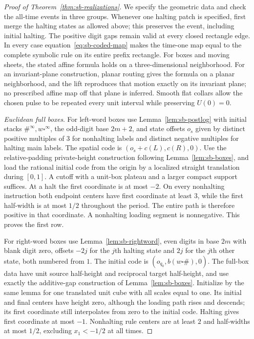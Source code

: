 \begin{proof}[Proof of Theorem~\ref{thm:sb-realizations}]
We specify the geometric data and check the all-time events in three groups.  Whenever one halting patch is specified, first merge the halting states as allowed above; this preserves the event, including initial halting.  The positive digit gaps remain valid at every closed rectangle edge.
In every case equation~\eqref{eq:sb-coded-map} makes the time-one map equal to the complete symbolic rule on its entire prefix rectangle.  For boxes and moving sheets, the stated affine formula holds on a three-dimensional neighborhood. For an invariant-plane construction, planar routing gives the formula on a planar neighborhood, and the lift reproduces that motion exactly on its invariant plane; no prescribed affine map off that plane is inferred.  Smooth flat collars allow the chosen pulse to be repeated every unit interval while preserving $U(0)=0$.

\emph{Euclidean full boxes.}
For left-word boxes use Lemma~\ref{lem:sb-postlog} with initial stacks $\#^\infty,w\square^\infty$, the odd-digit base $2m+2$, and state offsets $o_s$ given by distinct positive multiples of $3$ for nonhalting labels and distinct negative multiples for halting main labels.  The spatial code is $(o_s+c(L),c(R),0)$.  Use the relative-padding private-height construction following Lemma~\ref{lem:sb-boxes}, and load the rational initial code from the origin by a localized straight translation during $[0,1]$.  A cutoff with a unit-box plateau and a larger compact support suffices.  At a halt the first coordinate is at most $-2$.  On every nonhalting instruction both endpoint centers have first coordinate at least $3$, while the first half-width is at most $1/2$ throughout the period.  The entire path is therefore positive in that coordinate.  A nonhalting loading segment is nonnegative.  This proves the first row.

For right-word boxes use Lemma~\ref{lem:sb-rightword}, even digits in base $2m$ with blank digit zero, offsets $-2j$ for the $j$th halting state and $2j$ for the $j$th other state, both numbered from $1$.  The initial code is $(o_{q_0},b(w\square\#),0)$.  The full-box data have unit source half-height and reciprocal target half-height, and use exactly the additive-gap construction of Lemma~\ref{lem:sb-boxes}.  Initialize by the same lemma for one translated unit cube with all scales equal to one.  Its initial and final centers have height zero, although the loading path rises and descends; its first coordinate still interpolates from zero to the initial code.  Halting gives first coordinate at most $-1$.  Nonhalting rule centers are at least $2$ and half-widths at most $1/2$, excluding $x_1<-1/2$ at all times.


\end{proof}

